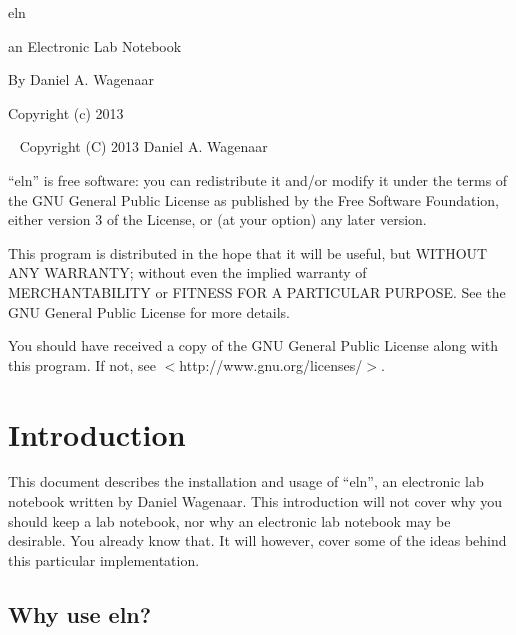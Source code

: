 \documentclass[11pt]{report}
\begin{document}
\thispagestyle{empty}
\begin{centering}
  {\Huge eln}
  \vskip30pt

  {\Large an Electronic Lab Notebook}
  \vskip60pt

  {\large By Daniel A. Wagenaar}
  \vfill
  
  {Copyright (c) 2013}
  
\end{centering}
\pagebreak
~
\vfill
\noindent Copyright (C) 2013 Daniel A. Wagenaar\medskip

``eln'' is free software: you can redistribute it and/or modify
it under the terms of the GNU General Public License as published by
the Free Software Foundation, either version 3 of the License, or
(at your option) any later version.

This program is distributed in the hope that it will be useful,
but WITHOUT ANY WARRANTY; without even the implied warranty of
MERCHANTABILITY or FITNESS FOR A PARTICULAR PURPOSE.  See the
GNU General Public License for more details.

You should have received a copy of the GNU General Public License
along with this program.  If not, see $<$http://www.gnu.org/licenses/$>$.
\pagebreak

\chapter{Introduction}

This document describes the installation and usage of ``eln'', an
electronic lab notebook written by Daniel Wagenaar.  This introduction
will not cover why you should keep a lab notebook, nor why an
electronic lab notebook may be desirable. You already know that.  It
will however, cover some of the ideas behind this particular
implementation.

\section{Why use eln?}
\end{document}

